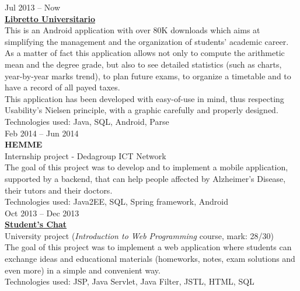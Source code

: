 \documentclass[]{friggeri-cv} %
\begin{document}
{Jul 2013 -- Now} \\
{\href{https://play.google.com/store/apps/details?id=com.povodev.libretto}{\textbf{Libretto Universitario}}} \\
{This is an Android application with over 80K downloads which aims at simplifying the management and the organization of students' academic career. As a matter of fact this application allows not only to compute the arithmetic mean and the degree grade, but also to see detailed statistics (such as charts, year-by-year marks trend), to plan future exams, to organize a timetable and to have a record of all payed taxes. \\
This application has been developed with easy-of-use in mind, thus respecting Usability's Nielsen principle, with a graphic carefully and properly designed.} \\
{Technologies used: Java, SQL, Android, Parse} \\


{Feb 2014 -- Jun 2014} \\
{\textbf{HEMME}} \\
{Internship project - Dedagroup ICT Network} \\
{The goal of this project was to develop and to implement a mobile application, supported by a backend, that can help people affected by Alzheimer's Disease, their tutors and their doctors.} \\
{Technologies used: Java2EE, SQL, Spring framework, Android} \\


{Oct 2013 -- Dec 2013} \\
{\href{https://github.com/stestisa/StudentsChat}{\textbf{Student's Chat}}} \\
{University project (\textit{Introduction to Web Programming} course, mark: 28/30)} \\
{The goal of this project was to implement a web application where students can exchange ideas and educational materials (homeworks, notes, exam solutions and even more) in a simple and convenient way.} \\
{Technologies used: JSP, Java Servlet, Java Filter, JSTL, HTML, SQL} \\

\end{document}
